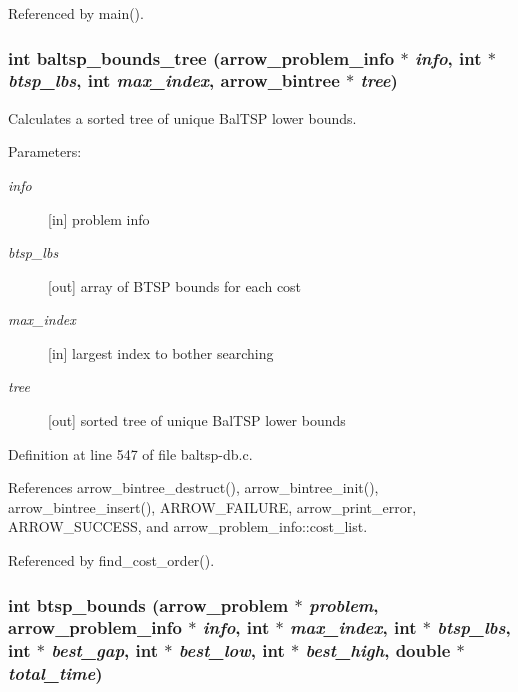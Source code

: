 Referenced by main().\hypertarget{lib_2baltsp_2baltsp-db_8c_f169c033b4bdc2c08c544daf0e91aa9a}{
\subsubsection[{baltsp\_\-bounds\_\-tree}]{\setlength{\rightskip}{0pt plus 5cm}int baltsp\_\-bounds\_\-tree ({\bf arrow\_\-problem\_\-info} $\ast$ {\em info}, \/  int $\ast$ {\em btsp\_\-lbs}, \/  int {\em max\_\-index}, \/  {\bf arrow\_\-bintree} $\ast$ {\em tree})}}
\label{lib_2baltsp_2baltsp-db_8c_f169c033b4bdc2c08c544daf0e91aa9a}


Calculates a sorted tree of unique BalTSP lower bounds. 

\begin{Desc}
\item[Parameters:]
\begin{description}
\item[{\em info}]\mbox{[}in\mbox{]} problem info \item[{\em btsp\_\-lbs}]\mbox{[}out\mbox{]} array of BTSP bounds for each cost \item[{\em max\_\-index}]\mbox{[}in\mbox{]} largest index to bother searching \item[{\em tree}]\mbox{[}out\mbox{]} sorted tree of unique BalTSP lower bounds \end{description}
\end{Desc}


Definition at line 547 of file baltsp-db.c.

References arrow\_\-bintree\_\-destruct(), arrow\_\-bintree\_\-init(), arrow\_\-bintree\_\-insert(), ARROW\_\-FAILURE, arrow\_\-print\_\-error, ARROW\_\-SUCCESS, and arrow\_\-problem\_\-info::cost\_\-list.

Referenced by find\_\-cost\_\-order().\hypertarget{lib_2baltsp_2baltsp-db_8c_793295ba41f25b193913629e408dd58e}{
\subsubsection[{btsp\_\-bounds}]{\setlength{\rightskip}{0pt plus 5cm}int btsp\_\-bounds ({\bf arrow\_\-problem} $\ast$ {\em problem}, \/  {\bf arrow\_\-problem\_\-info} $\ast$ {\em info}, \/  int $\ast$ {\em max\_\-index}, \/  int $\ast$ {\em btsp\_\-lbs}, \/  int $\ast$ {\em best\_\-gap}, \/  int $\ast$ {\em best\_\-low}, \/  int $\ast$ {\em best\_\-high}, \/  double $\ast$ {\em total\_\-time})}}
\label{lib_2baltsp_2baltsp-db_8c_793295ba41f25b193913629e408dd58e}



